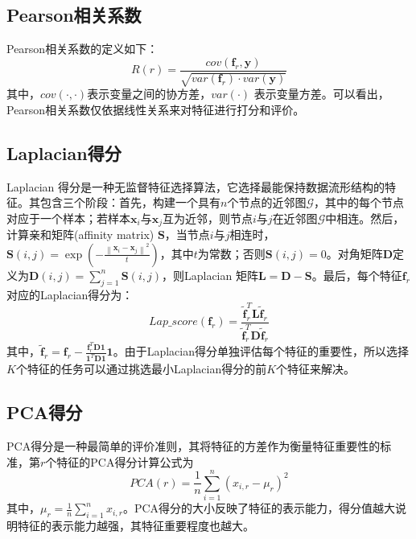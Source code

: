 \documentclass[lang=cn,10pt]{gorgeousnbook}
\numberwithin{equation}{section}%
\numberwithin{figure}{section}%
\begin{document}
\subsection{Pearson相关系数}
Pearson相关系数的定义如下：
\begin{equation}
R\left( r \right) =\frac{cov\left( \bm{f}_r,\boldsymbol{y} \right)}{\sqrt{var\left( \bm{f}_r \right) \cdot var\left( \boldsymbol{y} \right)}}
\end{equation}
其中，$cov\left( \cdot ,\cdot \right) $表示变量之间的协方差，$var(\cdot)$ 表示变量方差。可以看出，Pearson相关系数仅依据线性关系来对特征进行打分和评价。
\subsection{Laplacian得分}
Laplacian 得分是一种无监督特征选择算法，它选择最能保持数据流形结构的特征。其包含三个阶段：首先，构建一个具有$n$个节点的近邻图$\mathcal{G}$，其中的每个节点对应于一个样本；若样本$\bm{x}_i$与$\bm{x}_j$互为近邻，则节点$i$与$j$在近邻图$\mathcal{G}$中相连。然后，计算亲和矩阵(affinity matrix) $\bm{S}$，当节点$i$与$j$相连时，$\bm{S}\left( i,j \right) =\exp \left( -\frac{\left\| \boldsymbol{x}_i-\boldsymbol{x}_j \right\| ^2}{t} \right) $，其中$t$为常数；否则$\bm{S}\left( i,j \right)  = 0$。对角矩阵$\bm{D}$定义为$\bm{D}\left( i,j \right) =\sum\nolimits_{j=1}^n{\bm{S}\left( i,j \right)}$，则Laplacian 矩阵$\bm{L} = \bm{D}-\bm{S}$。最后，每个特征$\bm{f}_r$对应的Laplacian得分为：
\begin{equation}
Lap\_score(\bm{f}_r)=\frac{\tilde{\bm{f}}_{r}^{T}\bm{L}\tilde{\bm{f}}_r}{\tilde{\bm{f}}_{r}^{T}\bm{D}\tilde{\bm{f}}_r}
\end{equation}
其中，$\tilde{\bm{f}}_r=\bm{f}_r-\frac{\bm{f}_{r}^{T}\bm{D}\bm{1}}{\bm{1}^T\bm{D}\bm{1}}\bm{1}$。由于Laplacian得分单独评估每个特征的重要性，所以选择$K$个特征的任务可以通过挑选最小Laplacian得分的前$K$个特征来解决。
\subsection{PCA得分}
PCA得分是一种最简单的评价准则，其将特征的方差作为衡量特征重要性的标准，第$r$个特征的PCA得分计算公式为
\begin{equation}
PCA\left( r \right) =\frac{1}{n}\sum_{i=1}^n{\left( x_{i,r}-\mu _r \right) ^2}
\end{equation}
其中，$\mu _r=\frac{1}{n}\sum_{i=1}^n{x_{i,r}}$。PCA得分的大小反映了特征的表示能力，得分值越大说明特征的表示能力越强，其特征重要程度也越大。
\end{document}
